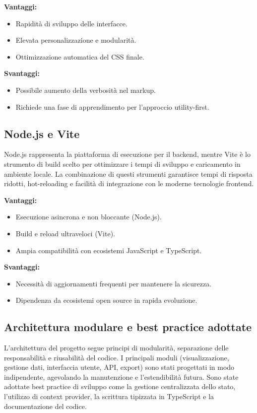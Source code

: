 \textbf{Vantaggi:}
\begin{itemize}
    \item Rapidità di sviluppo delle interfacce.
    \item Elevata personalizzazione e modularità.
    \item Ottimizzazione automatica del CSS finale.
\end{itemize}

\textbf{Svantaggi:}
\begin{itemize}
    \item Possibile aumento della verbosità nel markup.
    \item Richiede una fase di apprendimento per l’approccio utility-first.
\end{itemize}

\subsection{Node.js e Vite}

Node.js rappresenta la piattaforma di esecuzione per il backend, mentre Vite è lo strumento di build scelto per ottimizzare i tempi di sviluppo e caricamento in ambiente locale. La combinazione di questi strumenti garantisce tempi di risposta ridotti, hot-reloading e facilità di integrazione con le moderne tecnologie frontend.

\textbf{Vantaggi:}
\begin{itemize}
    \item Esecuzione asincrona e non bloccante (Node.js).
    \item Build e reload ultraveloci (Vite).
    \item Ampia compatibilità con ecosistemi JavaScript e TypeScript.
\end{itemize}

\textbf{Svantaggi:}
\begin{itemize}
    \item Necessità di aggiornamenti frequenti per mantenere la sicurezza.
    \item Dipendenza da ecosistemi open source in rapida evoluzione.
\end{itemize}

\subsection{Architettura modulare e best practice adottate}

L’architettura del progetto segue principi di modularità, separazione delle responsabilità e riusabilità del codice. I principali moduli (visualizzazione, gestione dati, interfaccia utente, API, export) sono stati progettati in modo indipendente, agevolando la manutenzione e l’estendibilità futura. Sono state adottate best practice di sviluppo come la gestione centralizzata dello stato, l’utilizzo di context provider, la scrittura tipizzata in TypeScript e la documentazione del codice.

